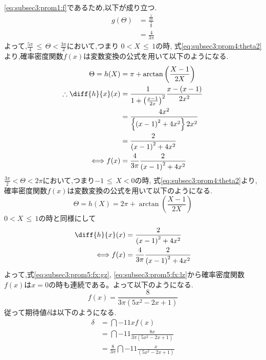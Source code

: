 \begin{enumerate}[(1)]
  \eqref{eq:subsec3:prom1:f}であるため,以下が成り立つ.
  \begin{align*}
    g(\Theta) &= \frac{\frac{1}{2\pi}}{\frac{3}{8}}\\
              &= \frac{4}{3\pi}
  \end{align*}
  よって,$\frac{5\pi}{4}\, \leq\, \Theta < \frac{3\pi}{2}$において,つまり $0 < X\, \leq\, 1$の時,
  式\eqref{eq:subsec3:prom4:theta2}より,確率密度関数$f(x)$は変数変換の公式を用いて以下のようになる.
  \begin{align}
    \Theta = h(X) &= \pi + \arctan\left(\frac{X - 1}{2X}\right) \nonumber\\
    \therefore \diff{h}{x}(x) &= \frac{1}{1 + \left(\frac{x - 1}{2x}\right)^2}\frac{x - (x - 1)}{2x^2}\nonumber\\
                  &= \frac{4x^2}{\left\{\left(x - 1\right)^2 + 4x^2\right\}2x^2}\nonumber\\
                  &= \frac{2}{\left(x - 1\right)^2 + 4x^2}\nonumber\\
    \Longleftrightarrow f(x) &= \frac{4}{3\pi}\frac{2}{\left(x - 1\right)^2 + 4x^2}\label{eq:subsec3:prom5:fx:gz}
  \end{align}
  $\frac{3\pi}{2} < \Theta < 2\pi$において,つまり$-1\, \leq\, X < 0$の時,
  式\eqref{eq:subsec3:prom4:theta2}より,確率密度関数$f(x)$は変数変換の公式を用いて以下のようになる.
  \begin{equation*}
    \Theta = h(X) = 2\pi + \arctan\left(\frac{X - 1}{2X}\right)
  \end{equation*}
  $0 < X\, \leq\, 1$の時と同様にして
  \begin{align}
    \diff{h}{x}(x) &= \frac{2}{\left(x - 1\right)^2 + 4x^2}\nonumber\\
    \Longleftrightarrow f(x) &= \frac{4}{3\pi}\frac{2}{\left(x - 1\right)^2 + 4x^2}\label{eq:subsec3:prom5:fx:lz}
  \end{align}
  よって,式\eqref{eq:subsec3:prom5:fx:gz}, \eqref{eq:subsec3:prom5:fx:lz}から確率密度関数$f(x)$は$x=0$の時も連続である。よって以下のようになる.
  \begin{equation*}
    f(x) = \frac{8}{3\pi(5x^2 - 2x + 1)}
  \end{equation*}
  従って期待値$\delta$は以下のようになる.
  \begin{align*}
    \delta &= \dint{-1}{1}{xf(x)}\\
          &= \dint{-1}{1}{\frac{8x}{3\pi(5x^2 - 2x + 1)}}\\
          &= \frac{8}{3\pi}\dint{-1}{1}{\frac{x}{(5x^2 - 2x + 1)}}\\

\end{align*}
\end{enumerate}
